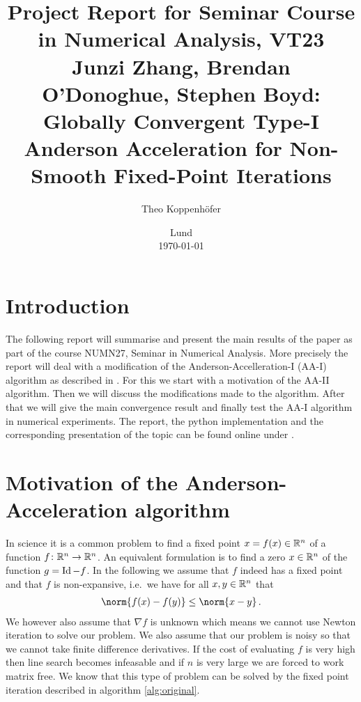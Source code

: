 




\title{ Project Report for Seminar Course in Numerical Analysis, VT23 \\[1ex]
	  \large Junzi Zhang, Brendan O'Donoghue, Stephen Boyd: Globally Convergent Type-I Anderson Acceleration for Non-Smooth Fixed-Point Iterations}
\author{Theo Koppenhöfer}
\date{Lund \\[1ex] \today}







\maketitle

\section{Introduction}


The following report will summarise and present the main results of the paper \cite{ZhaAA} as part of the course NUMN27, Seminar in Numerical Analysis. More precisely the report will deal with a modification of the Anderson-Accelleration-I (AA-I) algorithm as described in \cite{ZhaAA}. For this we start with a motivation of the AA-II algorithm. Then we will discuss the modifications made to the algorithm. After that we will give the main convergence result and finally test the AA-I algorithm in numerical experiments. The report, the python implementation and the corresponding presentation of the topic can be found online under \cite{Repository}.


\section{Motivation of the Anderson-Acceleration algorithm}

In science it is a common problem to find a fixed point $x=f(x)\in\mathbb{R}^n$ of a function $f\colon\mathbb{R}^n\to\mathbb{R}^n$. An equivalent formulation is to find a zero $x\in\mathbb{R}^n$ of the function $g=\operatorname{Id}-f$. In the following we assume that $f$ indeed has a fixed point and that $f$ is non-expansive, i.e.\ we have for all $x,y\in\mathbb{R}^n$ that
\begin{align*}
	\norm{f(x)-f(y)}\leq\norm{x-y}\,.
\end{align*}
We however also assume that $\nabla f$ is unknown which means we cannot use Newton iteration to solve our problem. We also assume that our problem is noisy so that we cannot take finite difference derivatives. If the cost of evaluating $f$ is very high then line search becomes infeasable and if $n$ is very large we are forced to work matrix free. We know that this type of problem can be solved by the fixed point iteration described in algorithm \ref{alg:original}.

